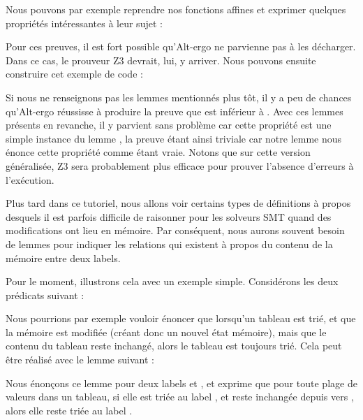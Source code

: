 

Nous pouvons par exemple reprendre nos fonctions affines et exprimer quelques 
propriétés intéressantes à leur sujet :






Pour ces preuves, il est fort possible qu'Alt-ergo ne parvienne pas à les 
décharger. Dans ce cas, le prouveur Z3 devrait, lui, y arriver. Nous pouvons 
ensuite construire cet exemple de code :






Si nous ne renseignons pas les lemmes mentionnés plus tôt, il y a peu de chances 
qu'Alt-ergo réussisse à produire la preuve que  est inférieur à .
Avec ces lemmes présents en revanche, il y parvient sans problème car cette 
propriété est une simple instance du lemme , la preuve 
étant ainsi triviale car notre lemme nous énonce cette propriété comme étant vraie.
Notons que sur cette version généralisée, Z3 sera probablement plus efficace pour
prouver l'absence d'erreurs à l'exécution.





Plus tard dans ce tutoriel, nous allons voir certains types de définitions à propos
desquels il est parfois difficile de raisonner pour les solveurs SMT quand des
modifications ont lieu en mémoire. Par conséquent, nous aurons souvent besoin de
lemmes pour indiquer les relations qui existent à propos du contenu de la mémoire
entre deux labels.


Pour le moment, illustrons cela avec un exemple simple. Considérons les deux
prédicats suivant :




Nous pourrions par exemple vouloir énoncer que lorsqu'un tableau est trié, et que
la mémoire est modifiée (créant donc un nouvel état mémoire), mais que le contenu du
tableau reste inchangé, alors le tableau est toujours trié. Cela peut être réalisé
avec le lemme suivant :




Nous énonçons ce lemme pour deux labels  et , et
exprime que pour toute plage de valeurs dans un tableau, si elle est triée au label
, et reste inchangée depuis  vers ,
alors elle reste triée au label .


